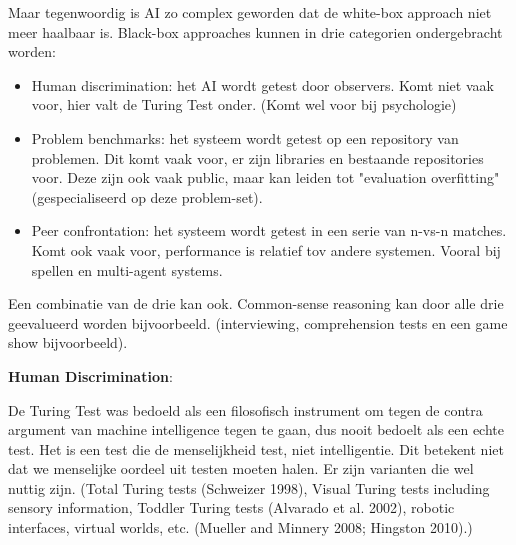 \documentclass[11pt]{article}
\begin{document}
Maar tegenwoordig is AI zo complex geworden dat de white-box approach niet meer haalbaar is. Black-box approaches kunnen in drie categorien ondergebracht worden:

\begin{itemize}
\item Human discrimination: het AI wordt getest door observers. Komt niet vaak voor, hier valt de Turing Test onder. (Komt wel voor bij psychologie)
\item Problem benchmarks: het systeem wordt getest op een repository van problemen. Dit komt vaak voor, er zijn libraries en bestaande repositories voor. Deze zijn ook vaak public, maar kan leiden tot "evaluation overfitting" (gespecialiseerd op deze problem-set).
\item Peer confrontation: het systeem wordt getest in een serie van n-vs-n matches. Komt ook vaak voor, performance is relatief tov andere systemen. Vooral bij spellen en multi-agent systems.
\end{itemize}

Een combinatie van de drie kan ook. Common-sense reasoning kan door alle drie geevalueerd worden bijvoorbeeld. (interviewing, comprehension tests en een game show bijvoorbeeld).

\textbf{Human Discrimination}:

De Turing Test was bedoeld als een filosofisch instrument om tegen de contra argument van machine intelligence tegen te gaan, dus nooit bedoelt als een echte test. Het is een test die de menselijkheid test, niet intelligentie. Dit betekent niet dat we menselijke oordeel uit testen moeten halen. Er zijn varianten die wel nuttig zijn. (Total Turing tests (Schweizer 1998), Visual Turing tests including sensory information, Toddler Turing tests (Alvarado et al. 2002), robotic interfaces, virtual worlds, etc. (Mueller and Minnery 2008; Hingston 2010).)
\end{document}

